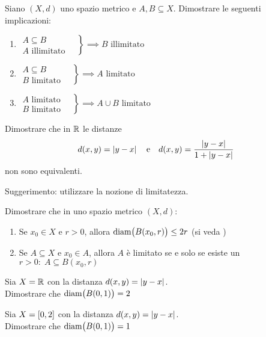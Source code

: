 \begin{exercise}
	Siano $(X,d)$ uno spazio metrico e $A,B\subseteq X$. Dimostrare le seguenti implicazioni:
	\begin{enumerate}
		\item $\left.\begin{array}{ll}
			A \subseteq B\\
			A \text{ illimitato}
			\end{array} \quad\right\} \implies B \text{ illimitato}$
		\item $\left.\begin{array}{ll}
			A \subseteq B\\
			B \text{ limitato}
			\end{array} \quad\right\} \implies A \text{ limitato}$
		\item $\left.\begin{array}{ll}
			A \text{ limitato}\\
			B \text{ limitato}
			\end{array} \quad\right\} \implies  A \cup B \text{ limitato}$
	\end{enumerate}
\end{exercise}
\begin{exercise}
	Dimostrare che in $\mathbb{R}$ le distanze
	\[d(x,y) = \left|y-x\right| \quad \text{e} \quad d(x,y) = \frac{\left|y-x\right|}{1+\left|y-x\right|}\]
	non sono equivalenti.
	\begin{solution}
		Suggerimento: utilizzare la nozione di limitatezza.
	\end{solution}
\end{exercise}
\begin{exercise}
	Dimostrare che in uno spazio metrico $(X,d)$:
	\begin{enumerate}
		\item Se $x_0 \in X$ e $r > 0$, allora $\operatorname{diam} \bigl( B(x_0, r) \bigr) \leq 2r$ (si veda )
		\item Se $A \subseteq X$ e $x_0 \in A$, allora $A$ è limitato se e solo se esiste un $r>0:\; A \subseteq B(x_0,r)$
	\end{enumerate}
\end{exercise}
\begin{exercise}
	Sia $X = \mathbb{R}$ con la distanza $d(x,y) = \left|y-x\right|$.\\
	Dimostrare che $\operatorname{diam} \bigl( B(0,1) \bigr) = 2$
\end{exercise}
\begin{exercise}
	\label{ex:diam_sp_metr}
	Sia $X = \left[0,2\right]$ con la distanza $d(x,y) = \left|y-x\right|$.\\
	Dimostrare che $\operatorname{diam} \bigl( B(0,1) \bigr) = 1$
\end{exercise}

